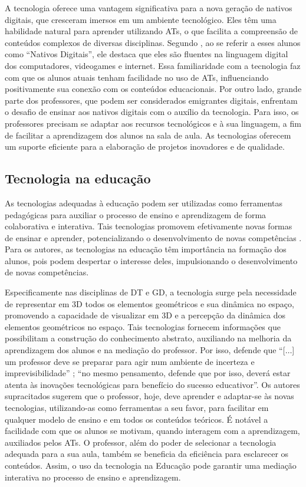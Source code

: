 A tecnologia oferece uma vantagem significativa para a nova geração de
nativos digitais, que cresceram imersos em um ambiente tecnológico. Eles
têm uma habilidade natural para aprender utilizando ATs, o que facilita
a compreensão de conteúdos complexos de diversas disciplinas. Segundo
\textcite[p. 1]{prensky2001}, ao se referir a esses alunos como \enquote{Nativos
Digitais}, ele destaca que eles são fluentes na linguagem digital dos
computadores, videogames e internet. Essa familiaridade com a tecnologia
faz com que os alunos atuais tenham facilidade no uso de ATs,
influenciando positivamente sua conexão com os conteúdos educacionais.
Por outro lado, grande parte dos professores, que podem ser considerados
emigrantes digitais, enfrentam o desafio de ensinar aos nativos digitais
com o auxílio da tecnologia. Para isso, os professores precisam se
adaptar aos recursos tecnológicos e à sua linguagem, a fim de facilitar
a aprendizagem dos alunos na sala de aula. As tecnologias oferecem um
suporte eficiente para a elaboração de projetos inovadores e de
qualidade.

\subsection{Tecnologia na educação}\label{sub-sec-tecnaeducação}
As tecnologias adequadas à educação podem ser utilizadas como
ferramentas pedagógicas para auxiliar o processo de ensino e
aprendizagem de forma colaborativa e interativa. Tais tecnologias
promovem efetivamente novas formas de ensinar e aprender,
potencializando o desenvolvimento de novas competências \cite[p. 83]{baeta2018}. Para os autores, as tecnologias na educação têm
importância na formação dos alunos, pois podem despertar o interesse
deles, impulsionando o desenvolvimento de novas competências.

Especificamente nas disciplinas de DT e GD, a tecnologia surge pela
necessidade de representar em 3D todos os elementos geométricos e sua
dinâmica no espaço, promovendo a capacidade de visualizar em 3D e a
percepção da dinâmica dos elementos geométricos no espaço. Tais
tecnologias fornecem informações que possibilitam a construção do
conhecimento abstrato, auxiliando na melhoria da aprendizagem dos alunos
e na mediação do professor. Por isso, \textcite[p. 1122]{novoa2017} defende que
\enquote{[$\ldots$] um professor deve se preparar para agir num ambiente de
	incerteza e imprevisibilidade} \textcite[p. 3]{brito2010}; “no mesmo pensamento,
defende que por isso, deverá estar atenta às inovações tecnológicas para
benefício do sucesso educativor”. Os autores supracitados sugerem que o
professor, hoje, deve aprender e adaptar-se às novas tecnologias,
utilizando-as como ferramentas a seu favor, para facilitar em qualquer
modelo de ensino e em todos os conteúdos teóricos. É notável a
facilidade com que os alunos se motivam, quando interagem com a
aprendizagem, auxiliados pelos ATs. O professor, além do poder de
selecionar a tecnologia adequada para a sua aula, também se beneficia da
eficiência para esclarecer os conteúdos. Assim, o uso da tecnologia na
Educação pode garantir uma mediação interativa no processo de ensino e
aprendizagem.


